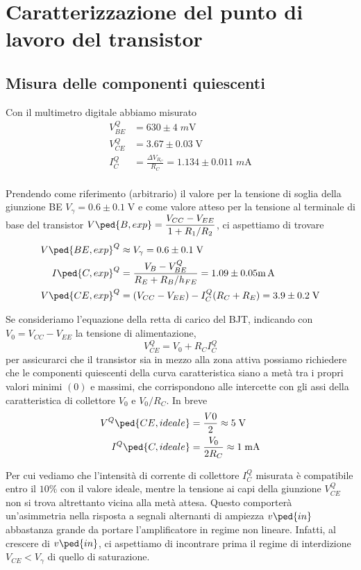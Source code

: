 \documentclass[10pt,a4paper]{article}
\begin{document}
\section{Caratterizzazione del punto di lavoro del transistor}
\subsection{Misura delle componenti quiescenti}
Con il multimetro digitale abbiamo misurato
\begin{align*}
V_{BE}^Q &= 630 \pm 4 \; \si{m\V} \\
V_{CE}^Q &= 3.67 \pm 0.03 \; \si{\V} \\
I_C^Q &= \frac{\Delta V_{R_C}}{R_C} = 1.134 \pm 0.011 \; \si{m\A} \\
\end{align*}

Prendendo come riferimento (arbitrario) il valore per la tensione di soglia
della giunzione BE $V_\gamma = 0.6 \pm 0.1 \; \si{\V}$ e come valore atteso
per la tensione al terminale di base del transistor
$\ds V\ped{B, exp} = \frac{V_{CC} - V_{EE}}{1 + R_1/R_2}$, ci aspettiamo di
trovare
\begin{align*}
V\ped{BE, exp}^Q &\approx V_\gamma = 0.6 \pm 0.1 \; \si{\V} \\
I\ped{C, exp}^Q &= \frac{V_B - V_{BE}^Q}{R_E + R_B/h_{FE}} =
1.09 \pm 0.05 \si{\m\A} \\
V\ped{CE, exp}^Q &= (V_{CC} - V_{EE}) - I_C^Q(R_C + R_E) = 3.9 \pm 0.2 \;
\si{\V}
\end{align*}

Se consideriamo l'equazione della retta di carico del BJT, indicando con
$V_0 = V_{CC} - V_{EE}$ la tensione di alimentazione,
\begin{equation*}
V_{CE}^Q = V_0 + R_C I_C^Q
\end{equation*}
per assicurarci che il transistor sia in mezzo alla zona attiva possiamo
richiedere che le componenti quiescenti della curva caratteristica siano a
metà tra i propri valori minimi $(0)$ e massimi, che corrispondono alle
intercette con gli assi della caratteristica di collettore $V_0$ e $V_0/R_C$.
In breve
\begin{align*}
V^Q\ped{CE, ideale} &= \frac{V0}{2} \approx 5 \; \si{\V} \\
I^Q\ped{C, ideale} &= \frac{V_0}{2R_C} \approx 1 \; \si{\mA}
\end{align*}

Per cui vediamo che l'intensità di corrente di collettore $I_C^Q$ misurata è
compatibile entro il $10 \%$ con il valore ideale, mentre la tensione ai capi
della giunzione $V_{CE}^Q$ non si trova altrettanto vicina alla metà attesa.
Questo comporterà un'asimmetria nella risposta a segnali alternanti di
ampiezza $v\ped{in}$ abbastanza grande da portare l'amplificatore in regime
non lineare. Infatti, al crescere di $v\ped{in}$, ci aspettiamo di incontrare
prima il regime di interdizione $V_{CE} < V_\gamma$ di quello di saturazione.
  
\end{document}
